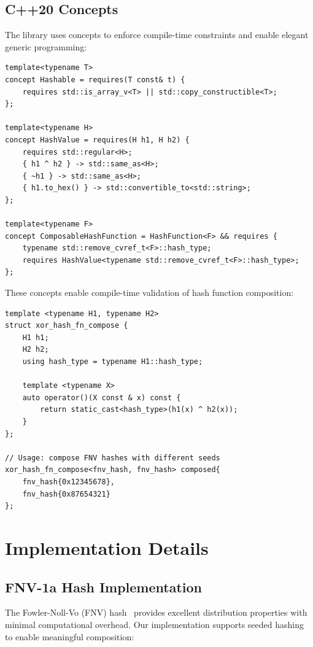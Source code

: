 \documentclass[11pt,a4paper]{article}
\theoremstyle{definition}
\begin{document}
\subsection{C++20 Concepts}

The library uses concepts to enforce compile-time constraints and enable elegant generic programming:

\begin{lstlisting}[caption={Core concept definitions}]
template<typename T>
concept Hashable = requires(T const& t) {
    requires std::is_array_v<T> || std::copy_constructible<T>;
};

template<typename H>
concept HashValue = requires(H h1, H h2) {
    requires std::regular<H>;
    { h1 ^ h2 } -> std::same_as<H>;
    { ~h1 } -> std::same_as<H>;
    { h1.to_hex() } -> std::convertible_to<std::string>;
};

template<typename F>
concept ComposableHashFunction = HashFunction<F> && requires {
    typename std::remove_cvref_t<F>::hash_type;
    requires HashValue<typename std::remove_cvref_t<F>::hash_type>;
};
\end{lstlisting}

These concepts enable compile-time validation of hash function composition:

\begin{lstlisting}[caption={XOR hash function composition (simplified)}]
template <typename H1, typename H2>
struct xor_hash_fn_compose {
    H1 h1;
    H2 h2;
    using hash_type = typename H1::hash_type;

    template <typename X>
    auto operator()(X const & x) const {
        return static_cast<hash_type>(h1(x) ^ h2(x));
    }
};

// Usage: compose FNV hashes with different seeds
xor_hash_fn_compose<fnv_hash, fnv_hash> composed{
    fnv_hash{0x12345678},
    fnv_hash{0x87654321}
};
\end{lstlisting}

\section{Implementation Details}

\subsection{FNV-1a Hash Implementation}

The Fowler-Noll-Vo (FNV) hash~\cite{fnv} provides excellent distribution properties with minimal computational overhead. Our implementation supports seeded hashing to enable meaningful composition:
\end{document}
